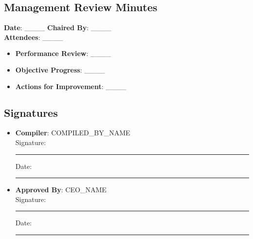 \documentclass[11pt]{article}
\newcommand{\compilerName}{{{COMPILED_BY_NAME}}}
\begin{document}
\subsection*{Management Review Minutes}

\textbf{Date}: \_\_\_\_ \textbf{Chaired By}: \_\_\_\_ \\
\textbf{Attendees}: \_\_\_\_

\begin{itemize}
    \item \textbf{Performance Review}: \_\_\_\_
    \item \textbf{Objective Progress}: \_\_\_\_
    \item \textbf{Actions for Improvement}: \_\_\_\_
\end{itemize}

\subsection*{Signatures}
\begin{itemize}
  \item \textbf{Compiler}: \compilerName \\
    Signature: \rule{5cm}{0.4pt} \quad Date: \rule{3cm}{0.4pt}
  \item \textbf{Approved By}: {{CEO_NAME}} \\
    Signature: \rule{5cm}{0.4pt} \quad Date: \rule{3cm}{0.4pt}
\end{itemize}
\end{document}
